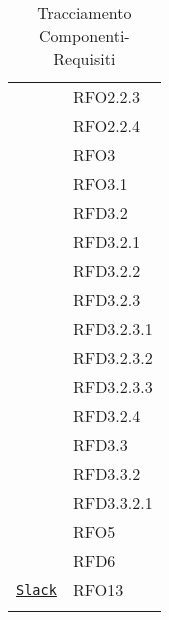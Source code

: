 \begin{longtable}{|>{\centering}m{10cm}|m{3cm}<{\centering}|}
& RFO2.2.3\\
& RFO2.2.4\\
& RFO3\\
& RFO3.1\\
& RFD3.2\\
& RFD3.2.1\\
& RFD3.2.2\\
& RFD3.2.3\\
& RFD3.2.3.1\\
& RFD3.2.3.2\\
& RFD3.2.3.3\\
& RFD3.2.4\\
& RFD3.3\\
& RFD3.3.2\\
& RFD3.3.2.1\\
& RFO5\\
& RFD6\\ \hline

\hyperref[Slack]{\texttt{Slack}} & RFO13\\ \hline

\caption[Tracciamento Componenti-Requisiti]{Tracciamento Componenti-Requisiti}
\label{tabella:pack-requi}
\end{longtable}
\clearpage
